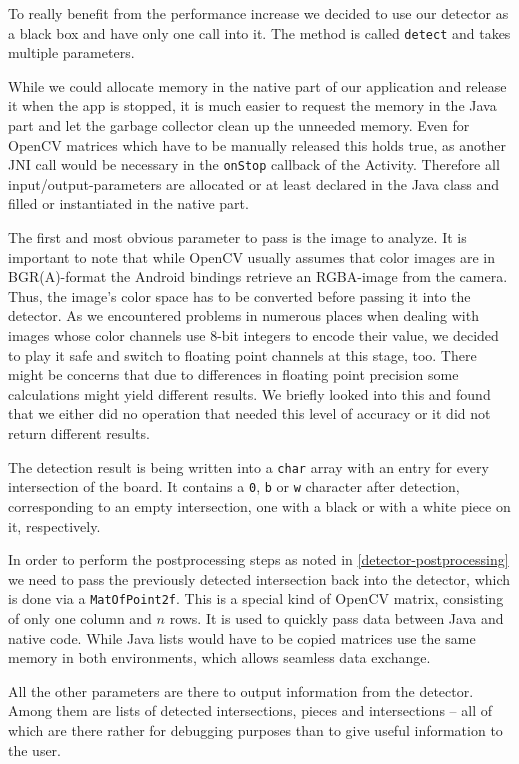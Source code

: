 	To really benefit from the performance increase we decided to use our detector as a black box and have only one call into it. The method is called \texttt{detect} and takes multiple parameters.

	While we could allocate memory in the native part of our application and release it when the app is stopped, it is much easier to request the memory in the Java part and let the garbage collector clean up the unneeded memory. Even for OpenCV matrices which have to be manually released this holds true, as another JNI call would be necessary in the \texttt{onStop} callback of the Activity. Therefore all input/output-parameters are allocated or at least declared in the Java class and filled or instantiated in the native part.

	The first and most obvious parameter to pass is the image to analyze. It is important to note that while OpenCV usually assumes that color images are in BGR(A)-format the Android bindings retrieve an RGBA-image from the camera. Thus, the image's color space has to be converted before passing it into the detector. As we encountered problems in numerous places when dealing with images whose color channels use 8-bit integers to encode their value, we decided to play it safe and switch to floating point channels at this stage, too. There might be concerns that due to differences in floating point precision some calculations might yield different results. We briefly looked into this and found that we either did no operation that needed this level of accuracy or it did not return different results.

	The detection result is being written into a \texttt{char} array with an entry for every intersection of the board. It contains a \texttt{0}, \texttt{b} or \texttt{w} character after detection, corresponding to an empty intersection, one with a black or with a white piece on it, respectively.

	In order to perform the postprocessing steps as noted in \ref{detector-postprocessing} we need to pass the previously detected intersection back into the detector, which is done via a \texttt{MatOfPoint2f}. This is a special kind of OpenCV matrix, consisting of only one column and $n$ rows. It is used to quickly pass data between Java and native code. While Java lists would have to be copied matrices use the same memory in both environments, which allows seamless data exchange.

	All the other parameters are there to output information from the detector. Among them are lists of detected intersections, pieces and intersections -- all of which are there rather for debugging purposes than to give useful information to the user.

